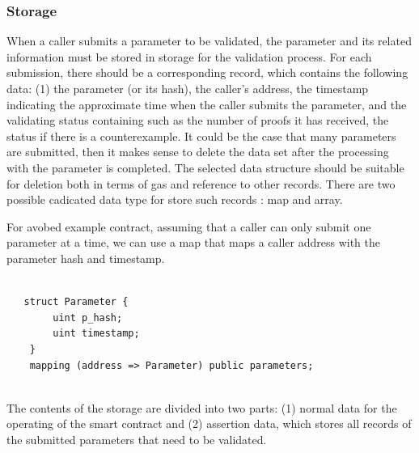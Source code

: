 \documentclass[runningheads]{llncs}
\begin{document}

\subsubsection{Storage}
When a caller submits a parameter to be validated, the parameter and its related information must be stored in storage for the validation process. For each submission, there should be a corresponding record, which contains the following data: (1) the parameter (or its hash), the caller's address, the timestamp indicating the approximate time when the caller submits the parameter, and the validating status containing such as the number of proofs it has received, the status if there is a counterexample. It could be the case that many parameters are submitted, then it makes sense to delete the data set after the processing with the parameter is completed. The selected data structure should be suitable for deletion both in terms of gas and reference to other records.  There are two possible cadicated data type for store such records : map and array. 

For avobed example contract, assuming that a caller can only submit one parameter at a time, we can use a map that maps a caller address with the parameter hash and timestamp.

\begin{lstlisting}[numbers=none]

   struct Parameter {
        uint p_hash;
        uint timestamp;
    }
    mapping (address => Parameter) public parameters;
    
\end{lstlisting}
 
The contents of the storage are divided into two parts: (1) normal data for the operating of the smart contract and (2) assertion data, which stores all records of the submitted parameters that need to be validated. 
\end{document}
